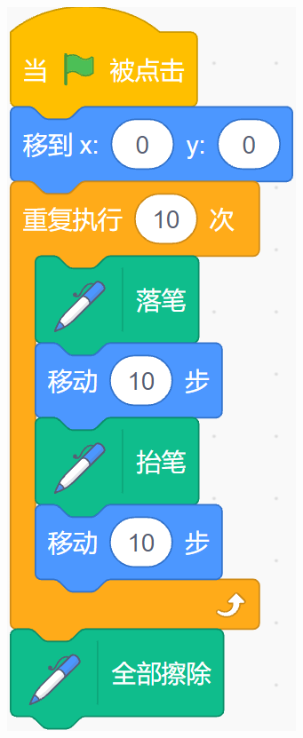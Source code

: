 \documentclass[10pt, a4paper]{article}
\begin{document}
\begin{enumerate}
\begin{figure}[htbp]
\begin{minipage}[t]{.1\textwidth}
                \includegraphics[width=\textwidth]{26.png}

\end{minipage}
\end{figure}
\end{enumerate}
\end{document}
